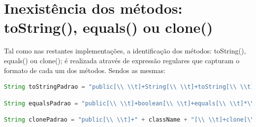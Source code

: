 \section{Inexistência dos métodos: toString(), equals() ou clone()}

\par Tal como nas restantes implementações, a identificação dos métodos: toString(), equals() ou clone(); é realizada através de expressão regulares que capturam o formato de cada um dos métodos. Sendos as mesmas:

\begin{lstlisting}[language=Java]  
String toStringPadrao = "public[\\ \\t]+String[\\ \\t]+toString[\\ \\t]*\\([\\ \\t]*\\)[\\ \\t]*";
\end{lstlisting}

\begin{lstlisting}[language=Java] 
String equalsPadrao = "public[\\ \\t]+boolean[\\ \\t]+equals[\\ \\t]*\\([\\ \\t]*Object[\\ \\t]+.*[\\ \\t]*\\)[\\ \\t]*";
\end{lstlisting}

\begin{lstlisting}[language=Java]  
String clonePadrao = "public[\\ \\t]+" + className + "[\\ \\t]+clone[\\ \\t]*\\([\\ \\t]*\\)[\\ \\t]*";
\end{lstlisting}

